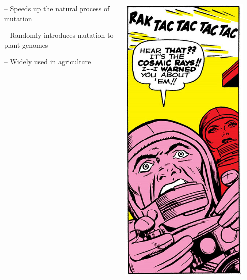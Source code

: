 \documentclass[xcolor=dvipsnames]{beamer}
\begin{document}
\begin{frame}
\begin{columns}
\begin{column}{0.3\textwidth}
\begin{itemize}
	\item[--] Speeds up the natural process of mutation 
	\item[--] Randomly introduces mutation to plant genomes
	\item[--] Widely used in agriculture
\end{itemize}
		\end{column}
		\begin{column}{0.25\textwidth}
			\includegraphics[keepaspectratio, width  = \textwidth]{img/cosmic}	
				\end{column}
	\end{columns}
	

\end{frame}
\end{document}
